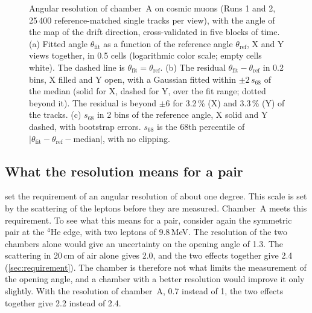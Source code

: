 \begin{figure}[tbp]
  \centering
  \caption{Angular resolution of chamber~A on cosmic muons (Runs 1 and 2, 25\,400 reference-matched single tracks per
  view), with the angle of the map of the drift direction, cross-validated in five blocks of time. (a) Fitted angle $\theta_\mathrm{fit}$ as a function of the reference angle $\theta_\mathrm{ref}$, X and Y views
  together, in 0.5\textdegree{} cells (logarithmic color scale; empty cells white). The dashed line is $\theta_\mathrm{fit}=\theta_\mathrm{ref}$.
  (b) The residual $\theta_\mathrm{fit}-\theta_\mathrm{ref}$ in 0.2\textdegree{} bins, X filled and Y open, with a
  Gaussian fitted within $\pm2\,s_{68}$ of the median (solid for X, dashed for Y, over the fit range; dotted beyond it).
  The residual is beyond $\pm6$\textdegree{} for 3.2\,\% (X) and 3.3\,\% (Y) of the tracks.
  (c) $s_{68}$ in 2\textdegree{} bins of the reference angle, X solid and Y dashed, with bootstrap errors. $s_{68}$ is the 68th
  percentile of $|\theta_\mathrm{fit}-\theta_\mathrm{ref}-\mathrm{median}|$, with no clipping.}
  \label{fig:angle}
\end{figure}

\subsection{What the resolution means for a pair}\label{sec:pointing}
 set the requirement of an angular resolution of about one degree. This scale is set by the
scattering of the leptons before they are measured. Chamber~A meets this requirement. To see what this means for a
pair, consider again the symmetric pair at the $^4$He edge, with two leptons of 9.8\,MeV. The resolution of the two
chambers alone would give an uncertainty on the opening angle of 1.3\textdegree. The scattering in 20\,cm of air
alone gives 2.0\textdegree, and the two effects together give 2.4\textdegree{} (\cref{sec:requirement}). The chamber
is therefore not what limits the measurement of the opening angle, and a chamber with a better resolution would
improve it only slightly. With the resolution of chamber~A, 0.7\textdegree{} instead of 1\textdegree, the two effects
together give 2.2\textdegree{} instead of 2.4\textdegree.

